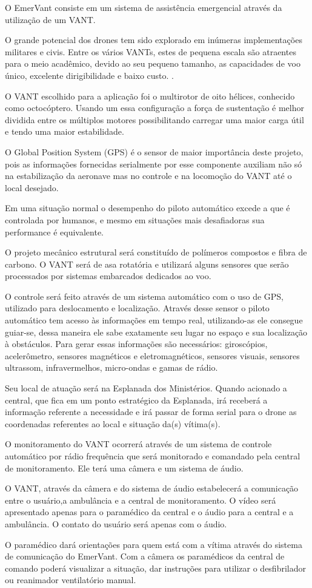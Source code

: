 O EmerVant consiste em um sistema de assistência emergencial através da utilização de um VANT.	

O grande potencial dos drones tem sido explorado em inúmeras implementações militares e civis. Entre os vários VANTs, estes de pequena escala são atraentes para o meio acadêmico, devido ao seu pequeno tamanho, as capacidades de voo único, excelente dirigibilidade e baixo custo. \cite{SDM}.

O VANT escolhido para a aplicação foi o multirotor de oito hélices, conhecido como octocóptero. Usando um essa configuração a força de sustentação é melhor dividida entre os múltiplos motores possibilitando carregar uma maior carga útil e tendo uma maior estabilidade.

O Global Position System (GPS) é o sensor de maior importância deste projeto, pois as informações fornecidas serialmente por esse componente auxiliam não só na estabilização da aeronave mas no controle e na locomoção do VANT até o local desejado.

Em uma situação normal o desempenho do piloto automático excede a que é controlada por humanos, e mesmo em situações mais desafiadoras sua performance é equivalente.

O projeto mecânico estrutural será constituído de polímeros compostos e fibra de carbono. O VANT será de asa rotatória e utilizará alguns sensores que serão processados por sistemas embarcados dedicados ao voo. 

O controle será feito através de um sistema automático com o uso de GPS, utilizado para deslocamento e localização. Através desse sensor o piloto automático tem acesso às informações em tempo real, utilizando-as ele consegue guiar-se, dessa maneira ele sabe exatamente seu lugar no espaço e sua localização à obstáculos. Para gerar essas informações são necessários: giroscópios, acelerômetro, sensores magnéticos e eletromagnéticos, sensores visuais, sensores ultrassom, infravermelhos, micro-ondas e gamas de rádio. \cite{UDE}

Seu local de atuação será na Esplanada dos Ministérios. Quando acionado a central, que fica em um ponto estratégico da Esplanada, irá receberá a informação referente a necessidade e irá passar de forma serial para o drone as coordenadas referentes  ao local e situação da(s) vítima(s).

O monitoramento do VANT ocorrerá através de um sistema de controle automático por rádio frequência que será monitorado e comandado pela central de monitoramento. Ele terá uma câmera e um sistema de áudio.

O VANT, através da câmera e do sistema de áudio estabelecerá a comunicação entre o usuário,a ambulância e a central de monitoramento. O vídeo será apresentado apenas para o paramédico da central e o áudio para a central e a ambulância. O contato do usuário será apenas com o áudio.

O paramédico dará orientações para quem está com a vítima através do sistema de comunicação do EmerVant. Com a câmera os paramédicos da central de comando poderá visualizar a situação, dar instruções para utilizar o desfibrilador ou reanimador ventilatório manual. 
